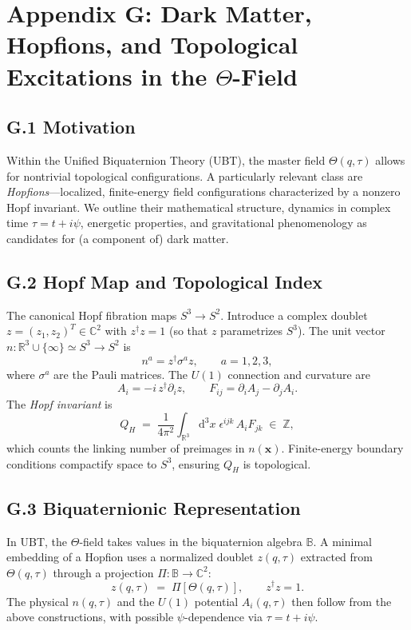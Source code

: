 \documentclass[12pt,a4paper]{article}
\begin{document}
\appendix
\section{Appendix G: Dark Matter, Hopfions, and Topological Excitations in the $\Theta$-Field}
\subsection*{G.1 Motivation}
Within the Unified Biquaternion Theory (UBT), the master field $\Theta(q,\tau)$ allows for nontrivial topological configurations. 
A particularly relevant class are \emph{Hopfions}---localized, finite-energy field configurations characterized by a nonzero Hopf invariant. 
We outline their mathematical structure, dynamics in complex time $\tau=t+i\psi$, energetic properties, and gravitational phenomenology as candidates for (a component of) dark matter.

\subsection*{G.2 Hopf Map and Topological Index}
The canonical Hopf fibration maps $S^3 \to S^2$. 
Introduce a complex doublet $z=(z_1,z_2)^T\in\mathbb{C}^2$ with $z^\dagger z = 1$ (so that $z$ parametrizes $S^3$). 
The unit vector $n:\mathbb{R}^3\cup\{\infty\}\simeq S^3 \to S^2$ is
\begin{equation}
n^a = z^\dagger \sigma^a z,\qquad a=1,2,3,
\end{equation}
where $\sigma^a$ are the Pauli matrices. The $U(1)$ connection and curvature are
\begin{equation}
A_i = -i\, z^\dagger \partial_i z,\qquad F_{ij} = \partial_i A_j - \partial_j A_i.
\end{equation}
The \emph{Hopf invariant} is
\begin{equation}
Q_H \;=\; \frac{1}{4\pi^2}\int_{\mathbb{R}^3} \mathrm{d}^3x\; \epsilon^{ijk}\, A_i F_{jk} \;\in\; \mathbb{Z},
\end{equation}
which counts the linking number of preimages in $n(\mathbf{x})$. Finite-energy boundary conditions compactify space to $S^3$, ensuring $Q_H$ is topological.

\subsection*{G.3 Biquaternionic Representation}
In UBT, the $\Theta$-field takes values in the biquaternion algebra $\mathbb{B}$. 
A minimal embedding of a Hopfion uses a normalized doublet $z(q,\tau)$ extracted from $\Theta(q,\tau)$ through a projection $\Pi:\mathbb{B}\to\mathbb{C}^2$:
\begin{equation}
z(q,\tau) \;=\; \Pi\!\left[\Theta(q,\tau)\right],\qquad z^\dagger z = 1.
\end{equation}
The physical $n(q,\tau)$ and the $U(1)$ potential $A_i(q,\tau)$ then follow from the above constructions, with possible $\psi$-dependence via $\tau=t+i\psi$.
\end{document}
